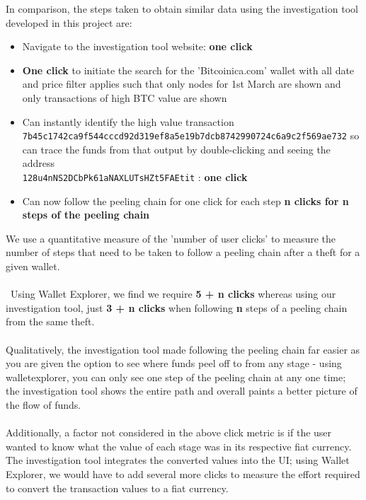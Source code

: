 In comparison, the steps taken to obtain similar data using the investigation tool developed in this project are:
\begin{itemize}
    \item Navigate to the investigation tool website: \textbf{one click}
    \item \textbf{One click} to initiate the search for the 'Bitcoinica.com' wallet with all date and price filter applies such that only nodes for 1st March are shown and only transactions of high BTC value are shown 
    \item Can instantly identify the high value transaction \\\texttt{7b45c1742ca9f544cccd92d319ef8a5e19b7dcb8742990724c6a9c2f569ae732} so can trace the funds from that output by double-clicking and seeing the address \\\texttt{128u4nNS2DCbPk61aNAXLUTsHZt5FAEtit} : \textbf{one click}
    \item Can now follow the peeling chain for one click for each step \textbf{n clicks for n steps of the peeling chain}
\end{itemize}
We use a quantitative measure of the 'number of user clicks' to measure the number of steps that need to be taken to follow a peeling chain after a theft for a given wallet. 
\\\\\
Using Wallet Explorer, we find we require \textbf{5 + n clicks} whereas using our investigation tool, just \textbf{3 + n clicks} when following \textbf{n} steps of a peeling chain from the same theft.
\\\\
Qualitatively, the investigation tool made following the peeling chain far easier as you are given the option to see where funds peel off to from any stage - using walletexplorer, you can only see one step of the peeling chain at any one time; the investigation tool shows the entire path and overall paints a better picture of the flow of funds. 
\\\\
Additionally, a factor not considered in the above click metric is if the user wanted to know what the value of each stage was in its respective fiat currency. The investigation tool integrates the converted values into the UI; using Wallet Explorer, we would have to add several more clicks to measure the effort required to convert the transaction values to a fiat currency.

